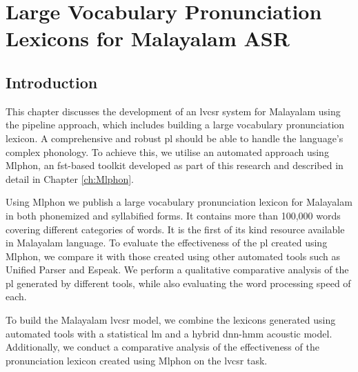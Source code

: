\chapter{Large Vocabulary Pronunciation Lexicons for Malayalam ASR} \label{ch:lvcsr} %

\graphicspath{{Figures/chapter5-lvcsr}}

\section{Introduction}

This chapter discusses the development of an \gls{lvcsr} system for Malayalam using the pipeline approach, which includes building a large vocabulary pronunciation lexicon. A comprehensive and robust \gls{pl} should be able to handle the language's complex phonology. To achieve this, we utilise an automated approach using Mlphon, an \gls{fst}-based toolkit developed as part of this research and described in detail in Chapter \ref{ch:Mlphon}.

Using Mlphon we publish a large vocabulary pronunciation lexicon for Malayalam in both phonemized and syllabified forms. It contains more than 100,000 words covering different categories of words. It is the first of its kind resource available in Malayalam language. To evaluate the effectiveness of the \gls{pl} created using Mlphon, we compare it with those created using other automated tools such as Unified Parser and Espeak. We perform a qualitative comparative analysis of the \gls{pl} generated by different tools, while also evaluating the word processing speed of each. 

To build the Malayalam \gls{lvcsr} model, we combine the lexicons generated using automated tools with a statistical \gls{lm} and a hybrid \gls{dnn}-\gls{hmm} acoustic model. Additionally, we conduct a comparative analysis of the effectiveness of the pronunciation lexicon created using Mlphon on the \gls{lvcsr} task.





